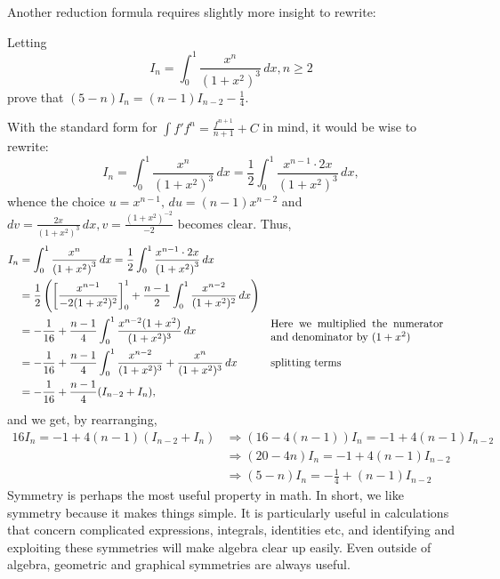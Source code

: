 \documentclass[../main.tex]{subfiles}
\begin{document}
Another reduction formula requires slightly more insight to rewrite:
\begin{example}
Letting 
$$I_n=\int_{0}^{1}\frac{x^n}{\left(1+x^2\right)^3} \,dx, n\geq 2$$
prove that $(5-n)I_n=(n-1)I_{n-2}-\frac{1}{4}$.
\end{example}
With the standard form for $\int f'f^n=\frac{f^{n+1}}{n+1}+C$ in mind, it would be wise to rewrite:
$$I_n=\int_{0}^{1}\frac{x^n}{\left(1+x^2\right)^3} \,dx
    =\frac{1}{2}\int_{0}^1\frac{x^{n-1}\cdot2x}{\left(1+x^2\right)^3} \,dx,$$
    whence the choice $u=x^{n-1}, \,du=(n-1)x^{n-2}$ and $dv=\frac{2x}{(1+x^2)^3} \,dx, v=\frac{(1+x^2)^{-2}}{-2}$ becomes clear.
Thus,
\begin{align*}
    I_n &=\int_{0}^{1}\frac{x^n}{\left(1+x^2\right)^3} \,dx
    =\frac{1}{2}\int_{0}^1\frac{x^{n-1}\cdot2x}{\left(1+x^2\right)^3} \,dx \\
    &=\frac{1}{2}\left(\left[\frac{x^{n-1}}{-2(1+x^2)^2}\right]_{0}^{1}+\frac{n-1}{2}\int_{0}^{1}\frac{x^{n-2}}{(1+x^2)^2}\,dx\right) \\
    &=-\frac{1}{16}+\frac{n-1}{4}\int_{0}^{1}\frac{x^{n-2}(1+x^2)}{(1+x^2)^3}\,dx &&\parbox{5.5cm}{Here we multiplied the numerator and denominator by $(1+x^2)$}\\
    &=-\frac{1}{16}+\frac{n-1}{4}\int_{0}^{1}\frac{x^{n-2}}{(1+x^2)^3}+\frac{x^n}{(1+x^2)^3}\,dx &&\text{splitting terms}\\
    &=-\frac{1}{16}+\frac{n-1}{4}(I_{n-2}+I_n),
\end{align*}
and we get, by rearranging, 
\begin{align*}
    16I_n=-1+4(n-1)(I_{n-2}+I_n) &\Longrightarrow (16-4(n-1))I_n=-1+4(n-1)I_{n-2} \\ &\Longrightarrow (20-4n)I_n=-1+4(n-1)I_{n-2} \\ &\Longrightarrow (5-n)I_n=-\frac{1}{4}+(n-1)I_{n-2}
\end{align*}
Symmetry is perhaps the most useful property in math. In short, we like symmetry because it makes things simple. It is particularly useful in calculations that concern complicated expressions, integrals, identities etc, and identifying and exploiting these symmetries will make algebra clear up easily. Even outside of algebra, geometric and graphical symmetries are always useful.
\end{document}
